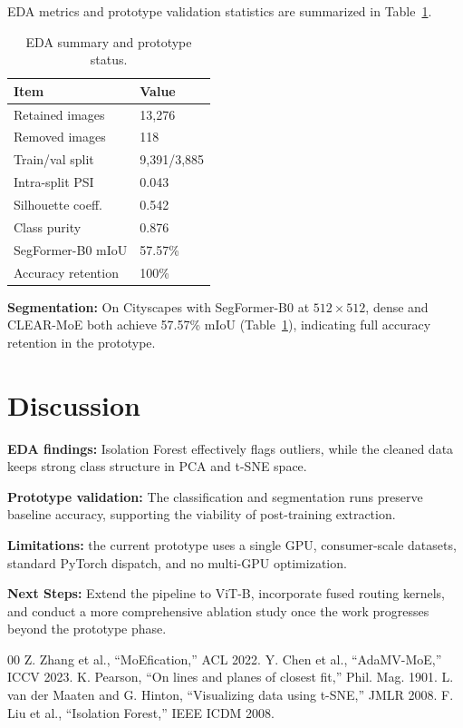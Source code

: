 \documentclass[conference]{IEEEtran}
\begin{document}
EDA metrics and prototype validation statistics are summarized in Table~\ref{tab:eda-summary}.

\begin{table}[h]
\caption{EDA summary and prototype status.}
\centering
\scriptsize
\begin{tabular}{p{}p{}}
\toprule
\textbf{Item} & \textbf{Value} \\
\midrule
Retained images & 13,276 \\
Removed images & 118 \\
Train/val split & 9,391/3,885 \\
Intra-split PSI & 0.043 \\
Silhouette coeff. & 0.542 \\
Class purity & 0.876 \\
SegFormer-B0 mIoU & 57.57\% \\
Accuracy retention & 100\% \\
\bottomrule
\end{tabular}
\label{tab:eda-summary}
\end{table}

\textbf{Segmentation:} On Cityscapes with SegFormer-B0 at $512\times512$, dense and CLEAR-MoE both achieve 57.57\% mIoU (Table~\ref{tab:eda-summary}), indicating full accuracy retention in the prototype.

\section{Discussion}

\textbf{EDA findings:} Isolation Forest effectively flags outliers, while the cleaned data keeps strong class structure in PCA and t-SNE space.

\textbf{Prototype validation:} The classification and segmentation runs preserve baseline accuracy, supporting the viability of post-training extraction.

\textbf{Limitations:} the current prototype uses a single GPU, consumer-scale datasets, standard PyTorch dispatch, and no multi-GPU optimization.

\textbf{Next Steps:} Extend the pipeline to ViT-B, incorporate fused routing kernels, and conduct a more comprehensive ablation study once the work progresses beyond the prototype phase.

\begin{thebibliography}{00}
 Z. Zhang et al., ``MoEfication,'' ACL 2022.
 Y. Chen et al., ``AdaMV-MoE,'' ICCV 2023.
 K. Pearson, ``On lines and planes of closest fit,'' Phil. Mag. 1901.
 L. van der Maaten and G. Hinton, ``Visualizing data using t-SNE,'' JMLR 2008.
 F. Liu et al., ``Isolation Forest,'' IEEE ICDM 2008.
\end{thebibliography}
\end{document}
